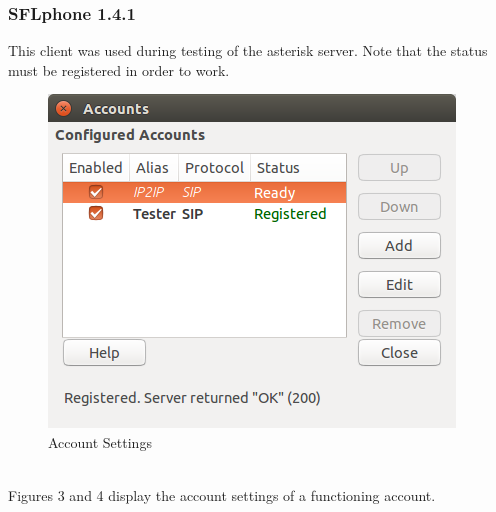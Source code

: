 \documentclass[a4paper,11pt]{report}
\begin{document}
\subsubsection{SFLphone 1.4.1}
This client was used during testing of the asterisk server. Note that the status must be registered in order to work.
\begin{figure}[h]
  \begin{center}
    \includegraphics[scale = 0.4]{SIP_accounts}
    \caption{Account Settings}
  \end{center}
\end{figure} \\
Figures 3 and 4 display the account settings of a functioning account.
\end{document}
